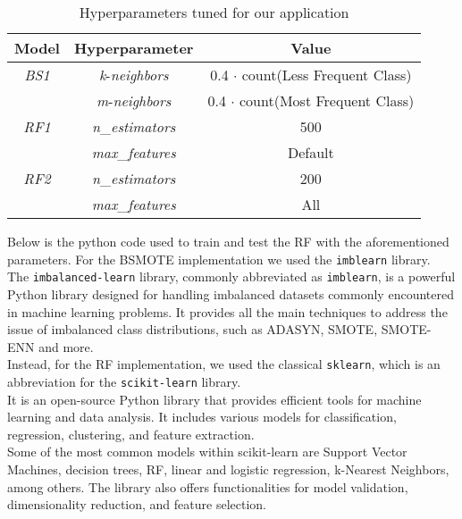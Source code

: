 \begin{table}[H]
    \centering
    \begin{tabular}{||c||c||c||}
        \hline
        \textbf{Model} & \textbf{Hyperparameter} & \textbf{Value} \\
        \hline
        \textit{BS1} & \textit{k}-\textit{neighbors} & 0.4 $\cdot$ count(Less Frequent Class)  \\
        & \textit{m}-\textit{neighbors} & 0.4 $\cdot$ count(Most Frequent Class)  \\
        \hline
        \textit{RF1} & \textit{n}\_\textit{estimators} & 500  \\
        & \textit{max}\_\textit{features} & Default  \\
        \hline
        \textit{RF2} & \textit{n}\_\textit{estimators} & 200  \\
        & \textit{max}\_\textit{features} & All  \\
        \hline
    \end{tabular}
    \caption{Hyperparameters tuned for our application}
    \label{tab:ml_param}
\end{table}

Below is the python code used to train and test the RF with the aforementioned parameters.
For the BSMOTE implementation we used the \texttt{imblearn} library.\\
The \texttt{imbalanced-learn} library, commonly abbreviated as \texttt{imblearn}, is a powerful Python library designed for handling imbalanced datasets commonly encountered in machine learning problems. 
It provides all the main techniques to address the issue of imbalanced class distributions, such as ADASYN, SMOTE, SMOTE-ENN and more.\\
Instead, for the RF implementation, we used the classical \texttt{sklearn}, which is an abbreviation for the \texttt{scikit-learn} library.\\
It is an open-source Python library that provides efficient tools for machine learning and data analysis. 
It includes various models for classification, regression, clustering, and feature extraction.\\ 
Some of the most common models within scikit-learn are Support Vector Machines, decision trees, RF, linear and logistic regression, k-Nearest Neighbors, among others. 
The library also offers functionalities for model validation, dimensionality reduction, and feature selection.
\clearpage
{}


